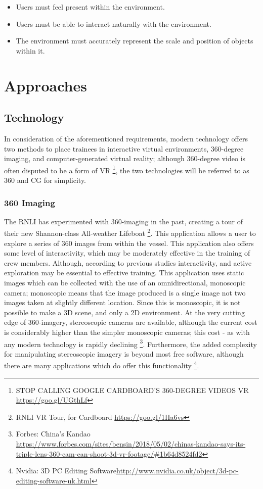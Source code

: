 \documentclass[ %
                    author={Elis Jones},
                supervisor={Dr. Kirsten Cater},
                    degree={BSc},
                     title={The Effect of Presentation Medium on Spatial Cognition},
                  subtitle={in the Virtual Environment},
                      year={2018} ]{dissertation}
\begin{document}
\begin{itemize}
    \item Users must feel present within the environment.
    \item Users must be able to interact naturally with the environment.
    \item The environment must accurately represent the scale and position of objects within it.
\end{itemize}

\section{Approaches}
\subsection{Technology}
In consideration of the aforementioned requirements, modern technology offers two methods to place trainees in interactive virtual environments, 360-degree imaging, and computer-generated virtual reality; although 360-degree video is often disputed to be a form of VR \footnote{STOP CALLING GOOGLE CARDBOARD'S 360-DEGREE VIDEOS VR \url{https://goo.gl/UGthLf}}, the two technologies will be referred to as 360 and CG for simplicity. 

\subsubsection{360 Imaging}
The RNLI has experimented with 360-imaging in the past, creating a tour of their new Shannon-class All-weather Lifeboat \footnote{RNLI VR Tour, for Cardboard \url{https://goo.gl/1Ha6vs}}. This application allows a user to explore a series of 360 images from within the vessel. This application also offers some level of interactivity, which may be moderately effective in the training of crew members. Although, according to previous studies interactivity, and active exploration may be essential to effective training. This application uses static images which can be collected with the use of an omnidirectional, monoscopic camera; monoscopic means that the image produced is a single image not two images taken at slightly different location. Since this is monoscopic, it is not possible to make a 3D scene, and only a 2D environment. At the very cutting edge of 360-imagery, stereoscopic cameras are available, although the current cost is considerably higher than the simpler monoscopic cameras; this cost - as with any modern technology is rapidly declining \footnote{Forbes: China's Kandao \url{https://www.forbes.com/sites/bensin/2018/05/02/chinas-kandao-says-its-triple-lens-360-cam-can-shoot-3d-vr-footage/#1b64d8524fd2}}. Furthermore, the added complexity for manipulating stereoscopic imagery is beyond most free software, although there are many applications which do offer this functionality \footnote{Nvidia: 3D PC Editing Software\url{http://www.nvidia.co.uk/object/3d-pc-editing-software-uk.html}}. 
\end{document}
